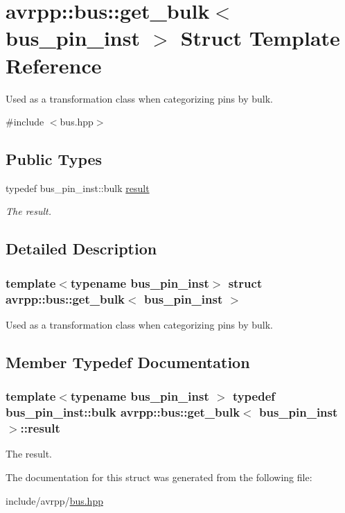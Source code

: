 \hypertarget{structavrpp_1_1bus_1_1get__bulk}{
\section{avrpp::bus::get\_\-bulk$<$ bus\_\-pin\_\-inst $>$ Struct Template Reference}
\label{structavrpp_1_1bus_1_1get__bulk}
}


Used as a transformation class when categorizing pins by bulk.  




{\ttfamily \#include $<$bus.hpp$>$}

\subsection*{Public Types}
\begin{DoxyCompactItemize}
\item 
typedef bus\_\-pin\_\-inst::bulk \hyperlink{structavrpp_1_1bus_1_1get__bulk_abefb77e5fe2328b8baa3c1826f214460}{result}
\begin{DoxyCompactList}\small\item\em The result. \item\end{DoxyCompactList}\end{DoxyCompactItemize}


\subsection{Detailed Description}
\subsubsection*{template$<$typename bus\_\-pin\_\-inst$>$ struct avrpp::bus::get\_\-bulk$<$ bus\_\-pin\_\-inst $>$}

Used as a transformation class when categorizing pins by bulk. 

\subsection{Member Typedef Documentation}
\hypertarget{structavrpp_1_1bus_1_1get__bulk_abefb77e5fe2328b8baa3c1826f214460}{
\subsubsection[{result}]{\setlength{\rightskip}{0pt plus 5cm}template$<$typename bus\_\-pin\_\-inst $>$ typedef bus\_\-pin\_\-inst::bulk {\bf avrpp::bus::get\_\-bulk}$<$ bus\_\-pin\_\-inst $>$::{\bf result}}}
\label{structavrpp_1_1bus_1_1get__bulk_abefb77e5fe2328b8baa3c1826f214460}


The result. 



The documentation for this struct was generated from the following file:\begin{DoxyCompactItemize}
\item 
include/avrpp/\hyperlink{bus_8hpp}{bus.hpp}\end{DoxyCompactItemize}
